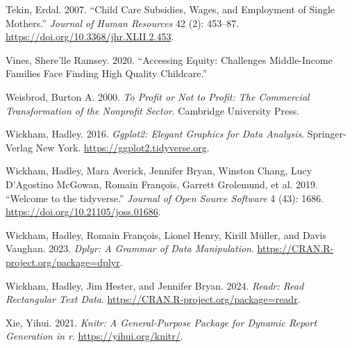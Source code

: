 \documentclass[
  letterpaper,
  DIV=11,
  numbers=noendperiod]{scrartcl}
\newlength{\cslhangindent}
\newenvironment{CSLReferences}[2] %
 {\begin{list}{}{%
  \setlength{\itemindent}{0pt}
  \setlength{\leftmargin}{0pt}
  \setlength{\parsep}{0pt}
  \ifodd #1
   \setlength{\leftmargin}{\cslhangindent}
   \setlength{\itemindent}{-1\cslhangindent}
  \fi
  \setlength{\itemsep}{#2\baselineskip}}}
 {\end{list}}
\begin{document}
\begin{CSLReferences}{1}{0}
Tekin, Erdal. 2007. {``Child Care Subsidies, Wages, and Employment of
Single Mothers.''} \emph{Journal of Human Resources} 42 (2): 453--87.
\url{https://doi.org/10.3368/jhr.XLII.2.453}.

Vines, Shere'lle Ramsey. 2020. {``Accessing Equity: Challenges
Middle-Income Families Face Finding High Quality Childcare.''}

Weisbrod, Burton A. 2000. \emph{To Profit or Not to Profit: The
Commercial Transformation of the Nonprofit Sector}. Cambridge University
Press.

Wickham, Hadley. 2016. \emph{Ggplot2: Elegant Graphics for Data
Analysis}. Springer-Verlag New York.
\url{https://ggplot2.tidyverse.org}.

Wickham, Hadley, Mara Averick, Jennifer Bryan, Winston Chang, Lucy
D'Agostino McGowan, Romain François, Garrett Grolemund, et al. 2019.
{``Welcome to the {tidyverse}.''} \emph{Journal of Open Source Software}
4 (43): 1686. \url{https://doi.org/10.21105/joss.01686}.

Wickham, Hadley, Romain François, Lionel Henry, Kirill Müller, and Davis
Vaughan. 2023. \emph{Dplyr: A Grammar of Data Manipulation}.
\url{https://CRAN.R-project.org/package=dplyr}.

Wickham, Hadley, Jim Hester, and Jennifer Bryan. 2024. \emph{Readr: Read
Rectangular Text Data}. \url{https://CRAN.R-project.org/package=readr}.

Xie, Yihui. 2021. \emph{Knitr: A General-Purpose Package for Dynamic
Report Generation in r}. \url{https://yihui.org/knitr/}.

\end{CSLReferences}
\end{document}
